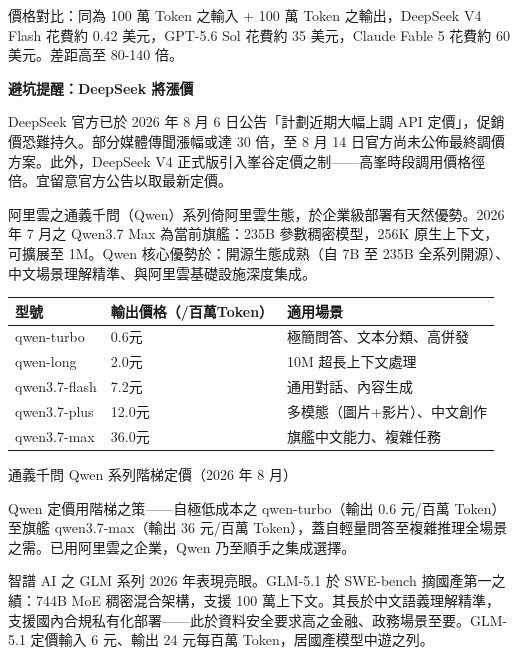 價格對比：同為 100 萬 Token 之輸入 + 100 萬 Token 之輸出，DeepSeek V4 Flash 花費約 0.42 美元，GPT-5.6 Sol 花費約 35 美元，Claude Fable 5 花費約 60 美元。差距高至 80-140 倍。

\textbf{避坑提醒：DeepSeek 將漲價}\par

DeepSeek 官方已於 2026 年 8 月 6 日公告「計劃近期大幅上調 API 定價」，促銷價恐難持久。部分媒體傳聞漲幅或達 30 倍，至 8 月 14 日官方尚未公佈最終調價方案。此外，DeepSeek V4 正式版引入峯谷定價之制——高峯時段調用價格徑倍。宜留意官方公告以取最新定價。


阿里雲之通義千問（Qwen）系列倚阿里雲生態，於企業級部署有天然優勢。2026 年 7 月之 Qwen3.7 Max 為當前旗艦：235B 參數稠密模型，256K 原生上下文，可擴展至 1M。Qwen 核心優勢於：開源生態成熟（自 7B 至 235B 全系列開源）、中文場景理解精準、與阿里雲基礎設施深度集成。

\begin{center}
\begin{tabularx}{\linewidth}{|X|X|X|}
\hline
\textbf{型號} & \textbf{輸出價格（/百萬Token）} & \textbf{適用場景} \tabularnewline
\hline
qwen-turbo & 0.6元 & 極簡問答、文本分類、高併發 \tabularnewline
qwen-long & 2.0元 & 10M 超長上下文處理 \tabularnewline
qwen3.7-flash & 7.2元 & 通用對話、內容生成 \tabularnewline
qwen3.7-plus & 12.0元 & 多模態（圖片+影片）、中文創作 \tabularnewline
qwen3.7-max & 36.0元 & 旗艦中文能力、複雜任務 \tabularnewline
\hline
\end{tabularx}
\end{center}

\begin{center}\small\color{gray}通義千問 Qwen 系列階梯定價（2026 年 8 月）\end{center}

Qwen 定價用階梯之策——自極低成本之 qwen-turbo（輸出 0.6 元/百萬 Token）至旗艦 qwen3.7-max（輸出 36 元/百萬 Token），蓋自輕量問答至複雜推理全場景之需。已用阿里雲之企業，Qwen 乃至順手之集成選擇。


智譜 AI 之 GLM 系列 2026 年表現亮眼。GLM-5.1 於 SWE-bench 摘國產第一之績：744B MoE 稠密混合架構，支援 100 萬上下文。其長於中文語義理解精準，支援國內合規私有化部署——此於資料安全要求高之金融、政務場景至要。GLM-5.1 定價輸入 6 元、輸出 24 元每百萬 Token，居國產模型中遊之列。


